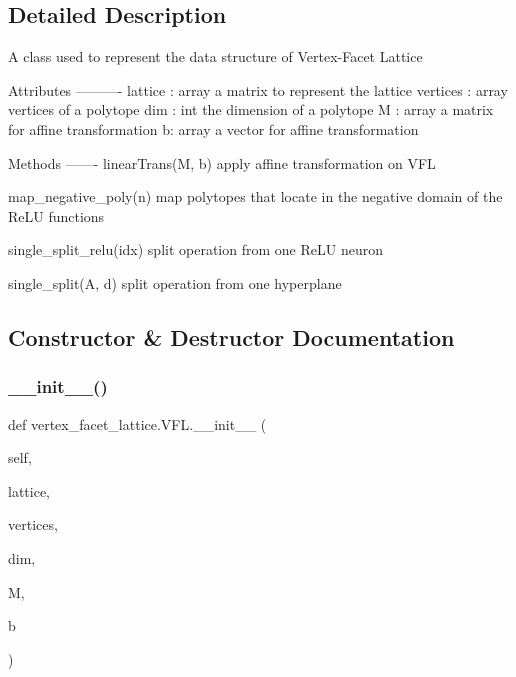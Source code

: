 \subsection{Detailed Description}
\begin{DoxyVerb}A class used to represent the data structure of Vertex-Facet Lattice

Attributes
----------
lattice : array
    a matrix to represent the lattice
vertices : array
    vertices of a polytope
dim : int
    the dimension of a polytope
M : array
    a matrix for affine transformation
b: array
    a vector for affine transformation

Methods
-------
linearTrans(M, b)
    apply affine transformation on VFL

map_negative_poly(n)
    map polytopes that locate in the negative domain of the ReLU functions

single_split_relu(idx)
    split operation from one ReLU neuron

single_split(A, d)
    split operation from one hyperplane
\end{DoxyVerb}
 

\subsection{Constructor \& Destructor Documentation}
\mbox{\label{classvertex__facet__lattice_1_1VFL_a0657c8c08ad4ed2b4c78dde5f020ca9e}} 
\subsubsection{\texorpdfstring{\+\_\+\+\_\+init\+\_\+\+\_\+()}{\_\_init\_\_()}}
{\footnotesize\ttfamily def vertex\+\_\+facet\+\_\+lattice.\+V\+F\+L.\+\_\+\+\_\+init\+\_\+\+\_\+ (\begin{DoxyParamCaption}\item[{}]{self,  }\item[{}]{lattice,  }\item[{}]{vertices,  }\item[{}]{dim,  }\item[{}]{M,  }\item[{}]{b }\end{DoxyParamCaption})}


